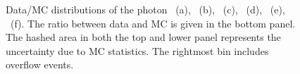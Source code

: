 \begin{figure}[htbp]
		\caption{Data/MC distributions of the photon \pt~(a), \mttwo~(b), \mtbmin~(c), \mtbmax~(d), \HT~(e), \drbb~(f). The ratio between data and MC is given in the bottom panel. The hashed area in both the top and lower panel represents the uncertainty due to MC statistics. The rightmost bin includes overflow events.}
		\label{fig:ttV} 
		\end{figure}

